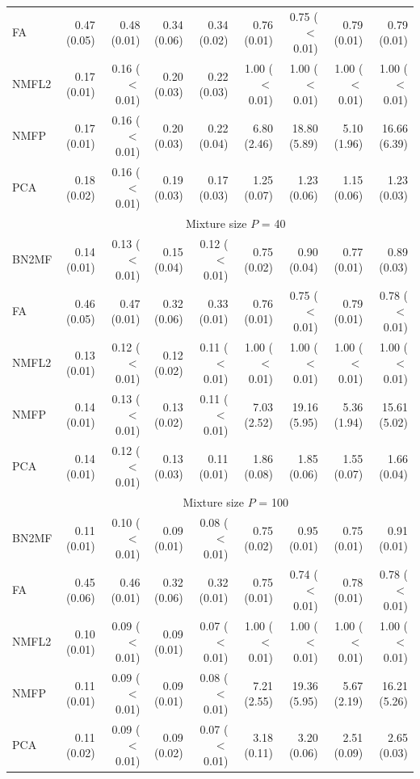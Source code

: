 {\begin{landscape}
\begin{table}[!htbp]
\begin{tabular}{lrr|rr|rr|rr}
FA & 0.47 (0.05) & 0.48 (0.01) & 0.34 (0.06) & 0.34 (0.02) & 0.76 (0.01) & 0.75 ($<$0.01) & 0.79 (0.01) & 0.79 (0.01) \\ 
NMFL2 & 0.17 (0.01) & 0.16 ($<$0.01) & 0.20 (0.03) & 0.22 (0.03) & 1.00 ($<$0.01) & 1.00 ($<$0.01) & 1.00 ($<$0.01) & 1.00 ($<$0.01) \\ 
NMFP & 0.17 (0.01) & 0.16 ($<$0.01) & 0.20 (0.03) & 0.22 (0.04) & 6.80 (2.46) & 18.80 (5.89) & 5.10 (1.96) & 16.66 (6.39) \\ 
PCA & 0.18 (0.02) & 0.16 ($<$0.01) & 0.19 (0.03) & 0.17 (0.03) & 1.25 (0.07) & 1.23 (0.06) & 1.15 (0.06) & 1.23 (0.03) \\ 
\hline 
& \multicolumn{8}{c}{Mixture size $P$ = 40} \\
\hline 
BN2MF & 0.14 (0.01) & 0.13 ($<$0.01) & 0.15 (0.04) & 0.12 ($<$0.01) & 0.75 (0.02) & 0.90 (0.04) & 0.77 (0.01) & 0.89 (0.03) \\ 
FA & 0.46 (0.05) & 0.47 (0.01) & 0.32 (0.06) & 0.33 (0.01) & 0.76 (0.01) & 0.75 ($<$0.01) & 0.79 (0.01) & 0.78 ($<$0.01) \\ 
NMFL2 & 0.13 (0.01) & 0.12 ($<$0.01) & 0.12 (0.02) & 0.11 ($<$0.01) & 1.00 ($<$0.01) & 1.00 ($<$0.01) & 1.00 ($<$0.01) & 1.00 ($<$0.01) \\ 
NMFP & 0.14 (0.01) & 0.13 ($<$0.01) & 0.13 (0.02) & 0.11 ($<$0.01) & 7.03 (2.52) & 19.16 (5.95) & 5.36 (1.94) & 15.61 (5.02) \\ 
PCA & 0.14 (0.01) & 0.12 ($<$0.01) & 0.13 (0.03) & 0.11 (0.01) & 1.86 (0.08) & 1.85 (0.06) & 1.55 (0.07) & 1.66 (0.04) \\ 
\hline 
& \multicolumn{8}{c}{Mixture size $P$ = 100} \\
\hline 
BN2MF & 0.11 (0.01) & 0.10 ($<$0.01) & 0.09 (0.01) & 0.08 ($<$0.01) & 0.75 (0.02) & 0.95 (0.01) & 0.75 (0.01) & 0.91 (0.01) \\ 
FA & 0.45 (0.06) & 0.46 (0.01) & 0.32 (0.06) & 0.32 (0.01) & 0.75 (0.01) & 0.74 ($<$0.01) & 0.78 (0.01) & 0.78 ($<$0.01) \\ 
NMFL2 & 0.10 (0.01) & 0.09 ($<$0.01) & 0.09 (0.01) & 0.07 ($<$0.01) & 1.00 ($<$0.01) & 1.00 ($<$0.01) & 1.00 ($<$0.01) & 1.00 ($<$0.01) \\ 
NMFP & 0.11 (0.01) & 0.09 ($<$0.01) & 0.09 (0.01) & 0.08 ($<$0.01) & 7.21 (2.55) & 19.36 (5.95) & 5.67 (2.19) & 16.21 (5.26) \\ 
PCA & 0.11 (0.02) & 0.09 ($<$0.01) & 0.09 (0.02) & 0.07 ($<$0.01) & 3.18 (0.11) & 3.20 (0.06) & 2.51 (0.09) & 2.65 (0.03) \\ 
\hline
\hline  
\end{tabular}
\end{table}
\endgroup
\end{landscape}

}
